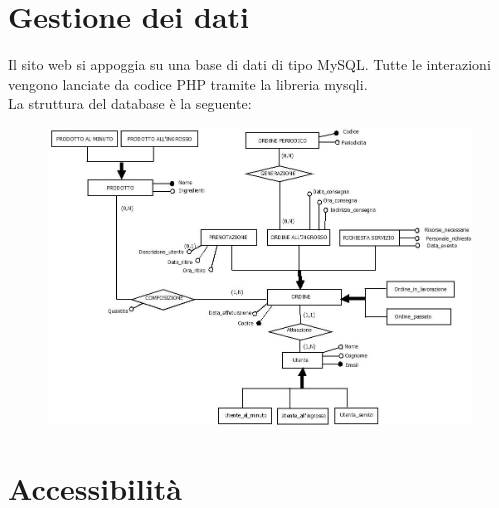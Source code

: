 \newpage

\section{Gestione dei dati}

Il sito web si appoggia su una base di dati di tipo MySQL. Tutte le interazioni vengono lanciate da codice PHP tramite la libreria mysqli.\\
La struttura del database è la seguente:

\begin{figure}[h!]
	\includegraphics[width=1\linewidth]{StyleLatex/ERTecWeb.jpeg}
\end{figure}

\section{Accessibilità}


